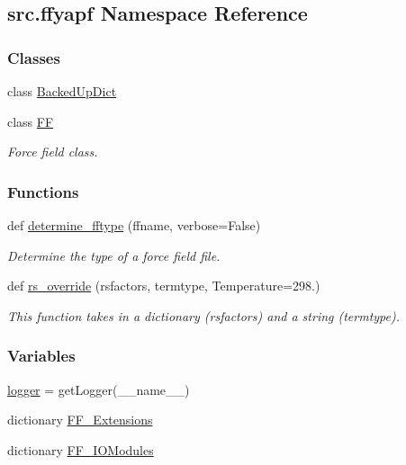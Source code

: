 \hypertarget{namespacesrc_1_1ffyapf}{}\subsection{src.\+ffyapf Namespace Reference}
\label{namespacesrc_1_1ffyapf}
\subsubsection*{Classes}
\begin{DoxyCompactItemize}
\item 
class \hyperlink{classsrc_1_1ffyapf_1_1BackedUpDict}{Backed\+Up\+Dict}
\item 
class \hyperlink{classsrc_1_1ffyapf_1_1FF}{FF}
\begin{DoxyCompactList}\small\item\em Force field class. \end{DoxyCompactList}\end{DoxyCompactItemize}
\subsubsection*{Functions}
\begin{DoxyCompactItemize}
\item 
def \hyperlink{namespacesrc_1_1ffyapf_aac35f4253f397d2dc6cb5171acecb37e}{determine\+\_\+fftype} (ffname, verbose=False)
\begin{DoxyCompactList}\small\item\em Determine the type of a force field file. \end{DoxyCompactList}\item 
def \hyperlink{namespacesrc_1_1ffyapf_a45f8578b3e3eab55235478c820ea6b1f}{rs\+\_\+override} (rsfactors, termtype, Temperature=298.)
\begin{DoxyCompactList}\small\item\em This function takes in a dictionary (rsfactors) and a string (termtype). \end{DoxyCompactList}\end{DoxyCompactItemize}
\subsubsection*{Variables}
\begin{DoxyCompactItemize}
\item 
\hyperlink{namespacesrc_1_1ffyapf_a36a17b3ff1bf917d6e0100ea1217d5aa}{logger} = get\+Logger(\+\_\+\+\_\+name\+\_\+\+\_\+)
\item 
dictionary \hyperlink{namespacesrc_1_1ffyapf_a6a87e161921b8562dd49ba909c2b23a5}{F\+F\+\_\+\+Extensions}
\item 
dictionary \hyperlink{namespacesrc_1_1ffyapf_a0131e28e9656a939158dde482700058b}{F\+F\+\_\+\+I\+O\+Modules}
\end{DoxyCompactItemize}


